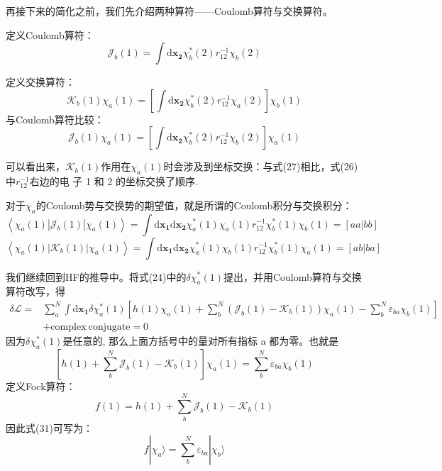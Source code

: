 \documentclass[]{article}
\begin{document}
再接下来的简化之前，我们先介绍两种算符——Coulomb算符与交换算符。

定义Coulomb算符：
\begin{equation}
	\mathscr{J}_b(1)=\int\mathrm{d}\mathbf{x_2}\chi_b^*(2)r^{-1}_{12}\chi_b(2)
\end{equation}

定义交换算符：
\begin{equation}
	\mathscr{K}_b(1)\chi_a(1)=\left[\int\mathrm{d}\mathbf{x_2}\chi_b^*(2)r^{-1}_{12}\chi_a(2) \right] \chi_b(1)
\end{equation}
与Coulomb算符比较：
\begin{equation}
	\mathscr{J}_b(1)\chi_a(1)=\left[ \int\mathrm{d}\mathbf{x_2}\chi_b^*(2)r^{-1}_{12}\chi_b(2)\right] \chi_a(1)
\end{equation}

可以看出来，$\mathscr{K}_b(1)$作用在$\chi_a(1)$时会涉及到坐标交换：与式(27)相比，式(26)中$r^{-1}_{12}$右边的电
子 1 和 2 的坐标交换了顺序.

对于$\chi_a$的Coulomb势与交换势的期望值，就是所谓的Coulomb积分与交换积分：
\begin{equation}
	\left\langle\chi_a(1)|\mathscr{J}_b(1)|\chi_a(1) \right\rangle =\int\mathrm{d}\mathbf{x_1}\mathrm{d}\mathbf{x_2}\chi_a^*(1)\chi_a(1)r^{-1}_{12}\chi_b^*(1)\chi_b(1)=[aa|bb]
\end{equation}
\begin{equation}
	\left\langle\chi_a(1)|\mathscr{K}_b(1)|\chi_a(1) \right\rangle =\int\mathrm{d}\mathbf{x_1}\mathrm{d}\mathbf{x_2}\chi_a^*(1)\chi_b(1)r^{-1}_{12}\chi_b^*(1)\chi_a(1)=[ab|ba]
\end{equation}

我们继续回到HF的推导中。将式(24)中的$\delta\chi_a^*(1)$提出，并用Coulomb算符与交换算符改写，得
\begin{align}
	\delta\mathscr{L}=
	&\sum\limits_a^N\int\mathrm{d}\mathbf{x_1}\delta\chi_a^*(1)\left[ h(1)\chi_a(1)+\sum\limits_b^N\left( \mathscr{J}_b(1)-\mathscr{K}_b(1)\right) \chi_a(1)-\sum\limits_b^N\varepsilon_{ba}\chi_b(1)\right] \nonumber\\
	&+\mathrm{complex\ conjugate}=0
\end{align}
因为$\delta\chi_a^*(1)$是任意的, 那么上面方括号中的量对所有指标 a 都为零。也就是
\begin{equation}
	\left[ h(1)+\sum\limits_b^N\mathscr{J}_b(1)-\mathscr{K}_b(1)\right]\chi_a(1)=\sum\limits_b^N\varepsilon_{ba}\chi_b(1)
\end{equation}
定义Fock算符：
\begin{equation}
	f(1)=h(1)+\sum\limits_b^N\mathscr{J}_b(1)-\mathscr{K}_b(1)
\end{equation}
因此式(31)可写为：
\begin{equation}
	f|\chi_a\rangle=\sum\limits_b^N\varepsilon_{ba}|\chi_b\rangle
\end{equation}
\end{document}
